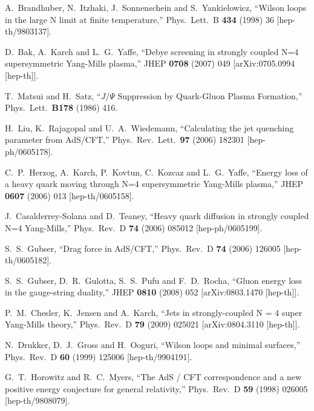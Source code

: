 \begin{thebibliography}{99}
  A.~Brandhuber, N.~Itzhaki, J.~Sonnenschein and S.~Yankielowicz,
  ``Wilson loops in the large N limit at finite temperature,''
  Phys.\ Lett.\ B {\bf 434} (1998) 36
  [hep-th/9803137].

  D.~Bak, A.~Karch and L.~G.~Yaffe,
  ``Debye screening in strongly coupled N=4 supersymmetric Yang-Mills plasma,''
  JHEP {\bf 0708} (2007) 049
  [arXiv:0705.0994 [hep-th]].


  T.~Matsui and H.~Satz,
  ``$J/\Psi$ Suppression by Quark-Gluon Plasma Formation,''
  Phys.\ Lett.\  {\bf B178 } (1986)  416.


  H.~Liu, K.~Rajagopal and U.~A.~Wiedemann,
  ``Calculating the jet quenching parameter from AdS/CFT,''
  Phys.\ Rev.\ Lett.\  {\bf 97} (2006) 182301
  [hep-ph/0605178].

  C.~P.~Herzog, A.~Karch, P.~Kovtun, C.~Kozcaz and L.~G.~Yaffe,
  ``Energy loss of a heavy quark moving through N=4 supersymmetric Yang-Mills plasma,''
  JHEP {\bf 0607} (2006) 013
  [hep-th/0605158].

  J.~Casalderrey-Solana and D.~Teaney,
  ``Heavy quark diffusion in strongly coupled N=4 Yang-Mills,''
  Phys.\ Rev.\ D {\bf 74} (2006) 085012
  [hep-ph/0605199].

  S.~S.~Gubser,
  ``Drag force in AdS/CFT,''
  Phys.\ Rev.\ D {\bf 74} (2006) 126005
  [hep-th/0605182].

  S.~S.~Gubser, D.~R.~Gulotta, S.~S.~Pufu and F.~D.~Rocha,
  ``Gluon energy loss in the gauge-string duality,''
  JHEP {\bf 0810} (2008) 052
  [arXiv:0803.1470 [hep-th]].

  P.~M.~Chesler, K.~Jensen and A.~Karch,
  ``Jets in strongly-coupled N = 4 super Yang-Mills theory,''
  Phys.\ Rev.\ D {\bf 79} (2009) 025021
  [arXiv:0804.3110 [hep-th]].

  N.~Drukker, D.~J.~Gross and H.~Ooguri,
  ``Wilson loops and minimal surfaces,''
  Phys.\ Rev.\ D {\bf 60} (1999) 125006
  [hep-th/9904191].

  G.~T.~Horowitz and R.~C.~Myers,
  ``The AdS / CFT correspondence and a new positive energy conjecture for general relativity,''
  Phys.\ Rev.\ D {\bf 59} (1998) 026005
  [hep-th/9808079].

\end{thebibliography}
